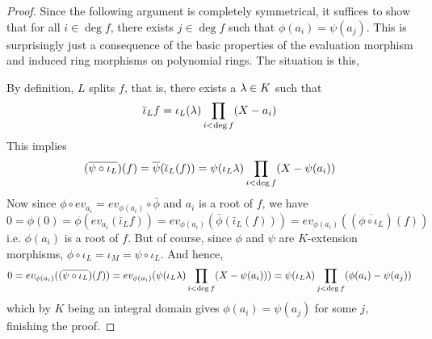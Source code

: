 \documentclass[../book.tex]{subfiles}
\begin{document}
\begin{proof}
    Since the following argument is completely symmetrical, it suffices to show
    that for all $i \in \deg f$, there exists $j \in \deg f$ such that
    $\phi(a_i) = \psi(a_j)$.
    This is surprisingly just a consequence
    of the basic properties of the evaluation morphism and 
    induced ring morphisms on polynomial rings.
    The situation is this, 
    \begin{figure}[H]
        \centering
    \end{figure}
    By definition, $L$ splits $f$, that is, there exists a $\lambda \in K$ such that 
    \[\overline{\iota}_L f = \iota_L(\lambda) \prod_{i < \deg f}(X - a_i)\]
    This implies \[
        (\overline{\psi \circ \iota_L})(f) 
        = \overline{\psi}(\overline{\iota}_L(f))
        = \psi(\iota_L \lambda) \prod_{i < \deg f} (X-\psi(a_i))
    \]
    Now since $\phi \circ ev_{a_i} = ev_{\phi(a_i)} \circ \bar\phi$
    and $a_i$ is a root of $f$, we have \[
        0 = \phi(0) = \phi (ev_{a_i} (\bar\iota_L f)) 
        = ev_{\phi(a_i)} (\bar\phi(\bar\iota_L (f)))
        = ev_{\phi(a_i)}((\overline{\phi \circ \iota_L}) (f))
    \]
    i.e. $\phi(a_i)$ is a root of $f$. 
    But of course, since $\phi$ and $\psi$ are $K$-extension morphisms,
    $\phi \circ \iota_L = \iota_M = \psi \circ \iota_L$.
    And hence, \[
        0 = ev_{\phi(a_i)}( (\overline{\psi \circ \iota_L})(f) )
        = ev_{\phi(a_i)} (\psi(\iota_L \lambda) \prod_{i < \deg f} (X-\psi(a_i)))
        = \psi(\iota_L \lambda) \prod_{j < \deg f} (\phi(a_i) -\psi(a_j))
    \]
    which by $K$ being an integral domain gives $\phi(a_i) = \psi(a_j)$
    for some $j$, finishing the proof. 
\end{proof}
\end{document}
